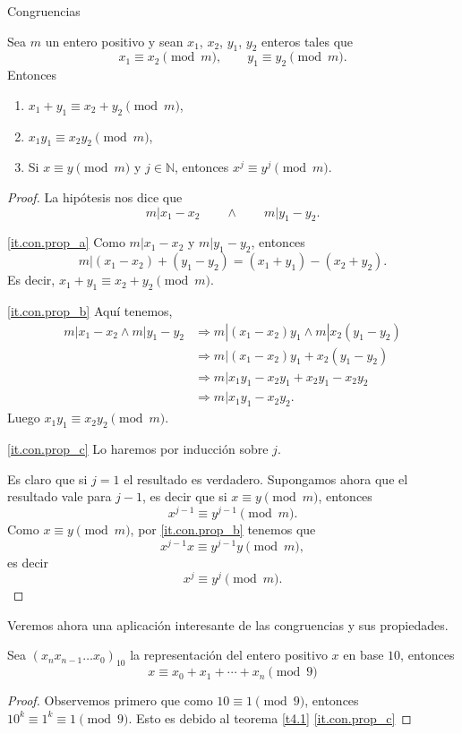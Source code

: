 \begin{section}{Congruencias}
\begin{teorema}\label{t4.1} Sea $m$ un entero positivo y sean $x_1$, $x_2$,
$y_1$, $y_2$ enteros tales que
$$
x_1 \equiv x_2 \pmod{m}, \qquad y_1 \equiv y_2 \pmod{m}.
$$
Entonces
\begin{enumerate}[label=\textit{\alph*)}]
\item\label{it.con.prop_a} $ x_1+ y_1 \equiv x_2+ y_2 \pmod{m}$,
\item\label{it.con.prop_b}  $x_1 y_1 \equiv x_2 y_2 \pmod{m}$,
\item\label{it.con.prop_c}  Si $x \equiv y \pmod{m}$  y $j \in  \mathbb N$, entonces $x^j \equiv y^j \pmod{m}$.
\end{enumerate}
\end{teorema}
\begin{proof}
La hipótesis nos dice que 
\begin{equation*}
    m | x_1 - x_2 \qquad \wedge \qquad m | y_1 - y_2.
\end{equation*}

\ref{it.con.prop_a} Como $m | x_1 - x_2$ y $m | y_1 - y_2$,  entonces 
$$
m |  (x_1 - x_2) + (y_1 - y_2) = (x_1 +y_1) -(x_2+y_2).
$$
Es decir, $ x_1+ y_1 \equiv x_2+ y_2 \pmod{m}$. 

\ref{it.con.prop_b} Aquí tenemos,
$$
\begin{aligned}
    m | x_1 - x_2  \wedge  m | y_1 - y_2 &\Rightarrow m | (x_1 - x_2)y_1  \wedge  m | x_2(y_1 - y_2) \\
    &\Rightarrow m | (x_1 - x_2)y_1 + x_2(y_1 - y_2) \\
    &\Rightarrow m | x_1y_1 - x_2y_1  + x_2y_1 - x_2y_2 \\
    &\Rightarrow m | x_1y_1  - x_2y_2.
\end{aligned}
$$
Luego $ x_1 y_1 \equiv x_2 y_2 \pmod{m}$.

\ref{it.con.prop_c}  Lo haremos por inducción sobre $j$. 

Es claro que si $j=1$ el resultado es verdadero. Supongamos ahora que el resultado vale para $j-1$, es decir que si  $x \equiv y \pmod{m}$, entonces 
$$
x^{j-1} \equiv y^{j-1} \pmod{m}.
$$
Como $x \equiv y \pmod{m}$,  por  \ref{it.con.prop_b}  tenemos que 
$$
x^{j-1}x \equiv y^{j-1}y  \pmod{m},
$$
es decir 
$$
x^j \equiv y^j \pmod{m}.
$$
\end{proof}


Veremos ahora una aplicación interesante de las congruencias y  sus propiedades. 

\begin{proposicion}\label{prop412}
Sea $(x_nx_{n-1}\ldots x_0)_{10}$ la representación del entero positivo $x$ en base $10$, entonces
$$
x \equiv x_0+x_1+\cdots+x_n \pmod{9}
$$
\end{proposicion}
\begin{proof}
 Observemos primero que como $10\equiv 1\pmod{9}$, entonces  $10^k\equiv 1^k \equiv 1\pmod{9}$. Esto es debido  al teorema \ref{t4.1} \ref{it.con.prop_c} 


\end{proof}
\end{section}
